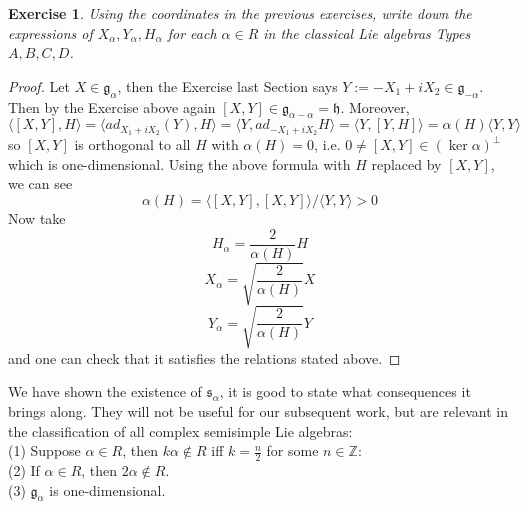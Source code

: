 \documentclass[11pt]{article}
\newtheorem{exercise}[theorem]{Exercise}
\newcommand{\bb}[1]{\mathbb{#1}}
\newcommand{\mf}[1]{\mathfrak{#1}}
\begin{document}
\begin{exercise}
Using the coordinates in the previous exercises, write down the expressions of $X_{\alpha}, Y_{\alpha}, H_{\alpha}$ for each $\alpha \in R$ in the classical Lie algebras Types $A, B, C, D$.
\end{exercise}

\begin{proof}
Let $X \in \mf{g}_{\alpha}$, then the Exercise last Section says $Y := -X_1 + iX_2 \in \mf{g}_{-\alpha}$. Then by the Exercise above again $[X,Y] \in \mf{g}_{\alpha - \alpha} = \mf{h}$. Moreover,
$$\langle [X,Y], H \rangle = \langle ad_{X_1 + i X_2} (Y), H \rangle = \langle Y, ad_{-X_1 + iX_2}H \rangle =  \langle Y, [Y,H] \rangle = \alpha(H) \langle Y, Y \rangle$$
so $[X,Y]$ is orthogonal to all $H$ with $\alpha(H) = 0$, i.e. $0 \neq [X,Y] \in (\ker \alpha)^{\perp}$ which is one-dimensional. Using the above formula with $H$ replaced by $[X,Y]$, we can see
$$\alpha (H) = \langle [X,Y], [X,Y] \rangle/ \langle Y, Y \rangle > 0$$
Now take
$$H_{\alpha} = \frac{2}{\alpha(H)}H$$
$$X_{\alpha} = \sqrt{ \frac{2}{\alpha(H)}}X$$
$$Y_{\alpha} = \sqrt{ \frac{2}{\alpha(H)}}Y$$
and one can check that it satisfies the relations stated above.
\end{proof}

We have shown the existence of $\mf{s}_{\alpha}$, it is good to state what consequences it brings along. They will not be useful for our subsequent work, but are relevant in the classification of all complex semisimple Lie algebras:\\
(1) Suppose $\alpha \in R$, then $k\alpha \notin R$ iff $k = \frac{n}{2}$ for some $n \in \bb{Z}$:\\
(2) If $\alpha \in R$, then $2\alpha \notin R$.\\
(3) $\mf{g}_{\alpha}$ is one-dimensional.\\
\end{document}
